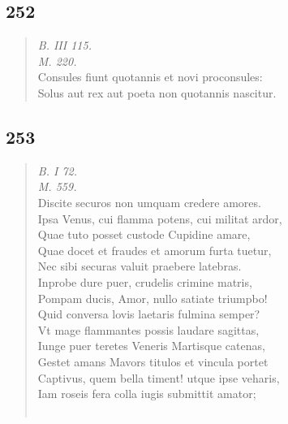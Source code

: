 \documentclass[11pt, a4paper]{report}
\begin{document}
            \subsection*{252}
      \begin{verse}
      \textit{B. III 115.} \\ \textit{M. 220.} \\ Consules fiunt quotannis et novi proconsules: \\ Solus aut rex aut poeta non quotannis nascitur. \\ 
      \end{verse}
  
            \subsection*{253}
      \begin{verse}
      \textit{B. I 72.} \\ \textit{M. 559.} \\ Discite securos non umquam credere amores. \\ Ipsa Venus, cui flamma potens, cui militat ardor, \\ Quae tuto posset custode Cupidine amare, \\ Quae docet et fraudes et amorum furta tuetur, \\ Nec sibi securas valuit praebere latebras. \\ Inprobe dure puer, crudelis crimine matris, \\ Pompam ducis, Amor, nullo satiate triumpbo! \\ Quid conversa lovis laetaris fulmina semper? \\ Vt mage flammantes possis laudare sagittas, \\ Iunge puer teretes Veneris Martisque catenas, \\ Gestet amans Mavors titulos et vincula portet \\ Captivus, quem bella timent! utque ipse veharis, \\ Iam roseis fera colla iugis submittit amator; \\ 
        ﻿\pagebreak 

\end{verse}
\end{document}
